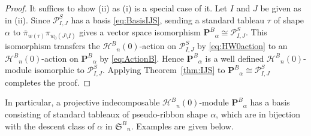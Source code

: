 \documentclass{amsart}
\newtheorem*{Young's Rule}{Young's Rule}
\theoremstyle{definition}
\theoremstyle{remark}
\numberwithin{equation}{section}
\begin{document}
\begin{proof}
It suffices to show (ii) as (i) is a special case of it. Let $I$ and $J$ be given as in (ii). Since ${\mathcal{P}_{I,J}^S}$ has a basis \eqref{eq:BasisIJS}, sending a standard tableau $\tau$ of shape $\alpha$ to ${\overline{\pi}}_{w(\tau)}\pi_{w_0(J\setminus I)}$ gives a vector space isomorphism ${\mathbf{P}^B}_\alpha\cong{\mathcal{P}_{I,J}^S}$. This isomorphism transfers the ${\mathcal{H}^B}_n(0)$-action on ${\mathcal{P}_{I,J}^S}$ by \eqref{eq:HW0action} to an ${\mathcal{H}^B}_n(0)$-action on ${\mathbf{P}^B}_\alpha$ by \eqref{eq:ActionB}. Hence ${\mathbf{P}^B}_\alpha$ is a well defined ${\mathcal{H}^B}_n(0)$-module isomorphic to ${\mathcal{P}_{I,J}^S}$. Applying Theorem~\ref{thm:IJS} to ${\mathbf{P}^B}_\alpha\cong{\mathcal{P}_{I,J}^S}$ completes the proof.
\end{proof}

In particular, a projective indecomposable ${\mathcal{H}^B}_n(0)$-module ${\mathbf{P}^B}_\alpha$ has a basis consisting of standard tableaux of pseudo-ribbon shape $\alpha$, which are in bijection with the descent class of $\alpha$ in ${{\mathfrak S}^B}_n$. Examples are given below.
\end{document}
